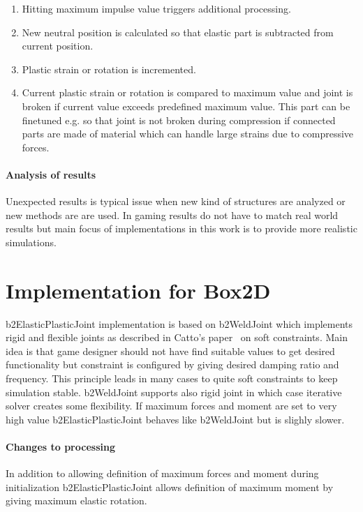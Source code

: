 \documentclass{jcgt}
\begin{document}
\begin{enumerate}
\item Hitting maximum impulse value triggers additional processing.
\item New neutral position is calculated so that elastic part is subtracted from current position.
\item Plastic strain or rotation is incremented.
\item Current plastic strain or rotation is compared to maximum value and joint is broken if 
current value exceeds predefined maximum value. This part can be finetuned e.g. so that joint is 
not broken during compression if connected parts are made of material which can handle large
strains due to compressive forces. 
\end{enumerate}


\paragraph{Analysis of results}
Unexpected results is typical issue when new kind of structures are analyzed or new methods are are
used. In gaming results do not have to match real world results but main focus of implementations
in this work is to provide more realistic simulations.

\section{Implementation for Box2D}
b2ElasticPlasticJoint implementation is based on b2WeldJoint which implements rigid and flexible joints as
described in Catto's paper~ on soft constraints. Main idea is that game designer should not have
find suitable values to get desired functionality but constraint is configured by giving desired  damping ratio and frequency.
This principle leads in many cases to quite soft constraints to keep simulation stable. 
b2WeldJoint supports also rigid joint in which case iterative solver creates some flexibility.
If maximum forces and moment are set to very high value b2ElasticPlasticJoint behaves like b2WeldJoint but is slighly slower.

\paragraph{Changes to processing} 
In addition to allowing definition of maximum forces and moment during initialization 
b2ElasticPlasticJoint allows definition of maximum moment by giving maximum elastic rotation.
\end{document}
